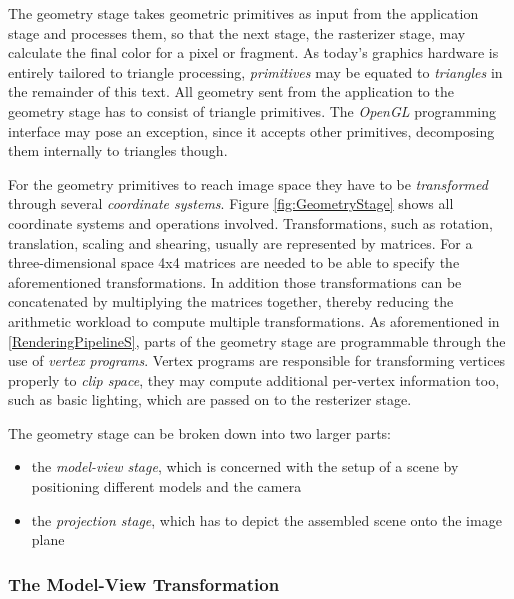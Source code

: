 The geometry stage takes geometric primitives as input from the application
stage and processes them, so that the next stage, the rasterizer stage, may
calculate the final color for a pixel or fragment. As today's graphics
hardware is entirely tailored to triangle processing, \textit{primitives} may 
be equated to \textit{triangles} in the remainder of this text. All geometry
sent from the application to the geometry stage has to consist of triangle
primitives. The \textit{OpenGL} programming interface may pose an exception,
since it accepts other primitives, decomposing them internally to triangles
though.

For the geometry primitives to reach image space they have to be
\textit{transformed} through several \textit{coordinate systems}. Figure
\ref{fig:GeometryStage} shows all coordinate systems and operations
involved. Transformations, such as rotation, translation, scaling and shearing,
usually are represented by matrices. For a three-dimensional space 4x4 matrices
are needed to be able to specify the aforementioned transformations. In addition
those transformations can be concatenated by multiplying the matrices together,
thereby reducing the arithmetic workload to compute multiple transformations.
As aforementioned in \ref{RenderingPipelineS}, parts of the geometry stage are
programmable through the use of \textit{vertex programs}. Vertex programs are
responsible for transforming vertices properly to \textit{clip space}, they
may compute additional per-vertex information too, such as basic lighting, which
are passed on to the resterizer stage.

The geometry stage can be broken down into two larger parts:
\begin{itemize}
 \item the \textit{model-view stage}, which is concerned with the setup of a
scene by positioning different models and the camera
 \item the \textit{projection stage}, which has to depict the assembled scene
onto the image plane
\end{itemize}

\subsubsection{The Model-View Transformation}

